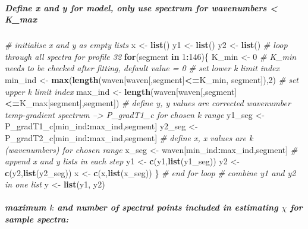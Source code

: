\documentclass[]{article}
\newenvironment{Shaded}{\begin{snugshade}}{\end{snugshade}}
\newcommand{\KeywordTok}[1]{\textcolor[rgb]{0.13,0.29,0.53}{\textbf{#1}}}
\newcommand{\DecValTok}[1]{\textcolor[rgb]{0.00,0.00,0.81}{#1}}
\newcommand{\StringTok}[1]{\textcolor[rgb]{0.31,0.60,0.02}{#1}}
\newcommand{\CommentTok}[1]{\textcolor[rgb]{0.56,0.35,0.01}{\textit{#1}}}
\newcommand{\ControlFlowTok}[1]{\textcolor[rgb]{0.13,0.29,0.53}{\textbf{#1}}}
\newcommand{\OperatorTok}[1]{\textcolor[rgb]{0.81,0.36,0.00}{\textbf{#1}}}
\newcommand{\NormalTok}[1]{#1}
\let\oldsubparagraph\subparagraph
\renewcommand{\subparagraph}[1]{\oldsubparagraph{#1}\mbox{}}
\begin{document}
\subparagraph{Define x and y for model, only use spectrum for
wavenumbers \textless{}
K\_max}\label{define-x-and-y-for-model-only-use-spectrum-for-wavenumbers-k_max}

\begin{Shaded}
\begin{Highlighting}[]
\CommentTok{# initialise x and y as empty lists}
\NormalTok{x <-}\StringTok{ }\KeywordTok{list}\NormalTok{()}
\NormalTok{y1 <-}\StringTok{ }\KeywordTok{list}\NormalTok{()}
\NormalTok{y2 <-}\StringTok{ }\KeywordTok{list}\NormalTok{()}
\CommentTok{# loop through all spectra for profile 32}
\ControlFlowTok{for}\NormalTok{(segment }\ControlFlowTok{in} \DecValTok{1}\OperatorTok{:}\DecValTok{146}\NormalTok{)\{}
\NormalTok{  K_min <-}\StringTok{ }\DecValTok{0} \CommentTok{# K_min needs to be checked after fitting, default value = 0}
  \CommentTok{# set lower k limit index}
\NormalTok{  min_ind <-}\StringTok{ }\KeywordTok{max}\NormalTok{(}\KeywordTok{length}\NormalTok{(waven[waven[,segment]}\OperatorTok{<=}\NormalTok{K_min, segment]),}\DecValTok{2}\NormalTok{)}
  \CommentTok{# set upper k limit index}
\NormalTok{  max_ind <-}\StringTok{ }\KeywordTok{length}\NormalTok{(waven[waven[,segment]}\OperatorTok{<=}\NormalTok{K_max[segment],segment]) }
  \CommentTok{# define y, y values are corrected wavenumber temp-gradient spectrum --> P_gradT1_c for chosen k range}
\NormalTok{  y1_seg <-}\StringTok{ }\NormalTok{P_gradT1_c[min_ind}\OperatorTok{:}\NormalTok{max_ind,segment]   }
\NormalTok{  y2_seg <-}\StringTok{ }\NormalTok{P_gradT2_c[min_ind}\OperatorTok{:}\NormalTok{max_ind,segment]}
  \CommentTok{# define x, x values are k (wavenumbers) for chosen range}
\NormalTok{  x_seg <-}\StringTok{ }\NormalTok{waven[min_ind}\OperatorTok{:}\NormalTok{max_ind,segment]}
  \CommentTok{# append x and y lists in each step}
\NormalTok{  y1 <-}\StringTok{ }\KeywordTok{c}\NormalTok{(y1,}\KeywordTok{list}\NormalTok{(y1_seg))}
\NormalTok{  y2 <-}\StringTok{ }\KeywordTok{c}\NormalTok{(y2,}\KeywordTok{list}\NormalTok{(y2_seg))}
\NormalTok{  x <-}\StringTok{ }\KeywordTok{c}\NormalTok{(x,}\KeywordTok{list}\NormalTok{(x_seg))}
\NormalTok{\} }\CommentTok{# end for loop}
\CommentTok{# combine y1 and y2 in one list}
\NormalTok{y <-}\StringTok{ }\KeywordTok{list}\NormalTok{(y1, y2)}
\end{Highlighting}
\end{Shaded}

\subparagraph{\texorpdfstring{maximum \(k\) and number of spectral
points included in estimating \(\chi\) for sample
spectra:}{maximum k and number of spectral points included in estimating \textbackslash{}chi for sample spectra:}}\label{maximum-k-and-number-of-spectral-points-included-in-estimating-chi-for-sample-spectra}
\end{document}
